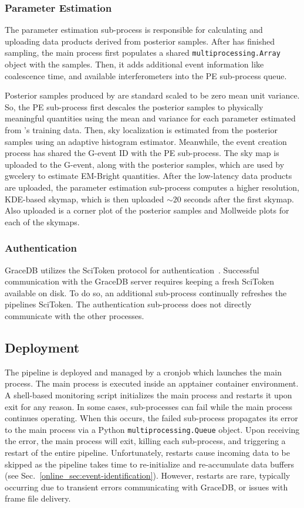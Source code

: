 \begin{refsection}
\subsubsection{Parameter Estimation}
The parameter estimation sub-process is responsible for calculating and uploading data products derived from posterior samples. 
After \amplfi has finished sampling, the main process first populates a shared \texttt{multiprocessing.Array} object with the samples. 
Then, it adds additional event information like coalescence time, and available interferometers into the PE sub-process queue. 

Posterior samples produced by \amplfi are standard scaled to be zero mean unit variance. 
So, the PE sub-process first descales the posterior samples to physically meaningful quantities using the mean and variance for each parameter estimated from \amplfi's training data.
Then, sky localization is estimated from the posterior samples using an adaptive histogram estimator. 
Meanwhile, the event creation process has shared the G-event ID with the PE sub-process. 
The sky map is uploaded to the G-event, along with the posterior samples, which are used by gwcelery to estimate EM-Bright quantities. 
After the low-latency data products are uploaded, the parameter estimation sub-process computes a higher resolution, KDE-based skymap, which is then uploaded $\sim20$ seconds after the first skymap.
Also uploaded is a corner plot of the posterior samples and Mollweide plots for each of the skymaps.

\subsubsection{Authentication}
GraceDB utilizes the SciToken protocol for authentication~\cite{DBLP:journals/corr/abs-1905-09816}. 
Successful communication with the GraceDB server requires keeping a fresh SciToken available on disk. 
To do so, an additional sub-process continually refreshes the pipelines SciToken. 
The authentication sub-process does not directly communicate with the other processes.

\subsection{Deployment}
The pipeline is deployed and managed by a cronjob which launches the main process. 
The main process is executed inside an apptainer container environment. 
A shell-based monitoring script initializes the main process and restarts it upon exit for any reason. 
In some cases, sub-processes can fail  while the main process continues operating. 
When this occurs, the failed sub-process propagates its error to the main process via a Python \texttt{multiprocessing.Queue} object. 
Upon receiving the error, the main process will  exit, killing each sub-process, and triggering a restart of the entire pipeline. 
Unfortunately, restarts cause incoming data to be skipped as the pipeline takes time to re-initialize and re-accumulate data buffers (see Sec.~\ref{online_sec:event-identification}). 
However, restarts are rare, typically occurring due to transient errors communicating with GraceDB, or issues with frame file delivery.


\end{refsection}
